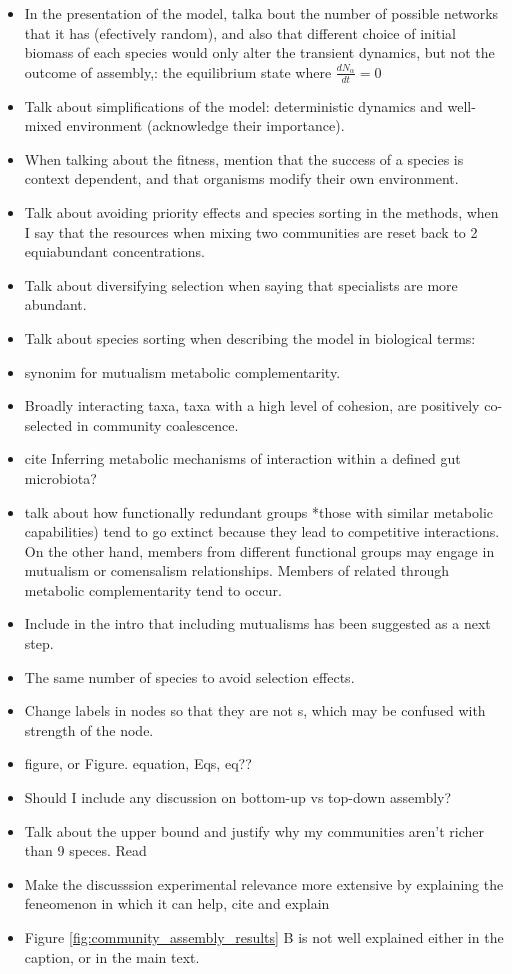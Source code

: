 \documentclass[titlepage,11pt]{article}
\begin{document}
\begin{linenumbers}
\begin{singlespace}
\begin{itemize}
	\item In the presentation of the model, talka bout the number of possible networks that it has (efectively random), and also that different choice of initial biomass of each species would only alter the transient dynamics, but not the outcome of assembly,: the equilibrium state where $ \frac{dN_{\alpha}}{dt} = 0 $
	\item Talk about simplifications of the model: deterministic dynamics and well-mixed environment (acknowledge their importance).
	\item When talking about the fitness, mention that the success of a species is context dependent, and that organisms modify their own environment.
	\item Talk about avoiding priority effects and species sorting in the methods, when I say that the resources when mixing two communities are reset back to 2 equiabundant concentrations.
	\item Talk about diversifying selection when saying that specialists are more abundant.
	\item Talk about species sorting when describing the model in biological terms: 
	\item synonim for mutualism metabolic complementarity.
	\item Broadly interacting taxa, taxa with a high level of cohesion, are positively co-selected in community coalescence.
	\item cite Inferring metabolic mechanisms of interaction within a defined gut microbiota?
	\item talk about how functionally redundant groups *those with similar metabolic capabilities) tend to go extinct because they lead to competitive interactions. On the other hand, members from different functional groups may engage in mutualism or comensalism relationships. Members of related through metabolic complementarity tend to occur.
	\item Include in the intro that including mutualisms has been suggested as a next step.
	\item The same number of species to avoid selection effects.
	\item Change labels in nodes so that they are not s, which may be confused with strength of the node.
	\item figure, or Figure. equation, Eqs, eq??
	\item Should I include any discussion on bottom-up vs top-down assembly?
	\item Talk about the upper bound and justify why my communities aren't richer than  9 speces. Read \citet{Cui2020}	
	\item Make the discusssion experimental relevance more extensive by explaining the feneomenon in which it can help, cite and explain \citet{Calderon2017}
	\item Figure \ref{fig:community_assembly_results} B is not well explained either in the caption, or in the main text.
\end{itemize}
\newpage

\end{singlespace}
\end{linenumbers}
\end{document}
